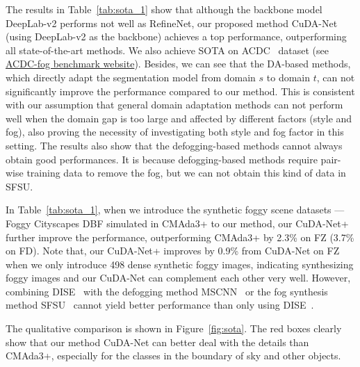 \documentclass[10pt,twocolumn,letterpaper]{article}
\def\td{t}
\begin{document}
The results in Table~\ref{tab:sota_1} show that although the backbone model DeepLab-v2 performs not well as RefineNet, our proposed method CuDA-Net (using DeepLab-v2 as the backbone) achieves a top performance, outperforming all state-of-the-art methods. 
We also achieve SOTA on ACDC~\cite{ACDC} dataset (see \href{https://acdc.vision.ee.ethz.ch/benchmarks#semanticSegmentation}{ACDC-fog benchmark website}).
Besides, we can see that the DA-based methods, which directly adapt the segmentation model from domain $s$ to domain $\td$, can not significantly improve the performance compared to our method. This is consistent with our assumption that general domain adaptation methods can not perform well when the domain gap is too large and affected by different factors (style and fog), also proving the necessity of investigating both style and fog factor in this setting.
The results also show that the defogging-based methods cannot always obtain good performances. It is because defogging-based methods require pair-wise training data to remove the fog, but we can not obtain this kind of data in SFSU.

In Table~\ref{tab:sota_1}, when we introduce the synthetic foggy scene datasets --- Foggy Cityscapes DBF simulated in CMAda3+ to our method, our CuDA-Net+ further improve the performance, outperforming CMAda3+ by 2.3\% on FZ (3.7\% on FD). 
Note that, our CuDA-Net+ improves by 0.9\% from CuDA-Net on FZ when we only introduce 498 dense synthetic foggy images, indicating synthesizing foggy images and our CuDA-Net can complement each other very well. 
However, combining DISE~\cite{chang2019all} with the defogging method MSCNN~\cite{ren2016single} or the fog synthesis method SFSU~\cite{sakaridis2018semantic} cannot yield better performance than only using DISE~\cite{chang2019all}.

The qualitative comparison is shown in Figure~\ref{fig:sota}. 
The red boxes clearly show that our method CuDA-Net can better deal with the details than CMAda3+, especially for the classes in the boundary of sky and other objects.
\end{document}
